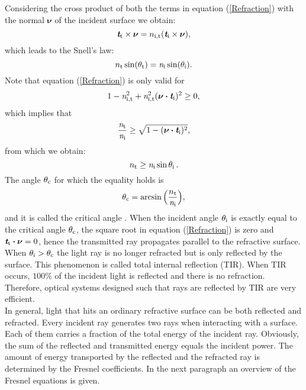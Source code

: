 Considering the cross product of both the terms in equation (\ref{Refraction}) with the normal $\boldsymbol{\nu}$ of the incident surface we obtain:
\begin{equation}
\textit{\textbf{t}}_\textrm{t}\times\boldsymbol{\nu} = n_{\textrm{i},\textrm{t}}(\textit{\textbf{t}}_\textrm{i}\times\boldsymbol{\nu}),
\end{equation}
which leads to the Snell's law:
\begin{equation}\label{eq:snell}
n_\textrm{t}\sin(\theta_\textrm{t}) = \textit{n}_\textrm{i}\sin(\theta_\textrm{i}).
\end{equation}
Note that equation (\ref{Refraction}) is only valid for 
\begin{equation}\label{tir}
1-\textit{n}_{\textrm{i},\textrm{t}}^2+\textit{n}_{\textrm{i},\textrm{t}}^2(\boldsymbol{\nu}\boldsymbol{\cdot}\textit{\textbf{t}}_\textrm{i})^2\geq 0,
\end{equation} which implies that
\begin{equation}
\frac{\textit{n}_\textrm{t}}{\textit{n}_\textrm{i}}\geq \sqrt{1-(\boldsymbol{\nu}\boldsymbol{\cdot}\textit{\textbf{t}}_\textrm{i})^2},
\end{equation}
from which we obtain:
\begin{equation}
 n_\textrm{t}\geq \textit{n}_\textrm{i} \sin\theta_\textrm{i}\,.
\end{equation}
 The angle $\theta_{\textrm{c}}$ for which the equality holds is
\begin{equation}\label{critical}
\theta_{\textrm{c}} = \arcsin\Big(\frac{n_\textrm{t}}{\textit{n}_\textrm{i}}\Big),
\end{equation} and it is called the critical angle \cite{chaves2015introduction}.
When the incident angle $\theta_{\textrm{i}}$ is exactly equal to the critical angle $\theta_{\textrm{c}}$, the square root in equation (\ref{Refraction}) is zero and $\textit{\textbf{t}}_\textrm{t}\boldsymbol{\cdot}\boldsymbol{\nu}=0$, hence the transmitted ray propagates parallel to the refractive surface. 
When $\theta_{\textrm{i}}>\theta_{\textrm{c}}$ the light ray is no longer refracted but is only reflected by the surface. This phenomenon is called total internal reflection (TIR). When TIR occurs, $100\%$ of the incident light is reflected and there is no refraction. Therefore, optical systems designed such that rays are reflected by TIR are very efficient. \\ \indent 
In general, light that hits an ordinary refractive surface can be both reflected and refracted. Every incident ray generates two rays when interacting with a surface. Each of them carries a fraction of the total energy of the incident ray. Obviously, the sum of the reflected and transmitted energy equals the incident power.
The amount of energy transported by the reflected and the refracted ray is determined by the Fresnel coefficients.
In the next paragraph an overview of the Fresnel equations is given.
